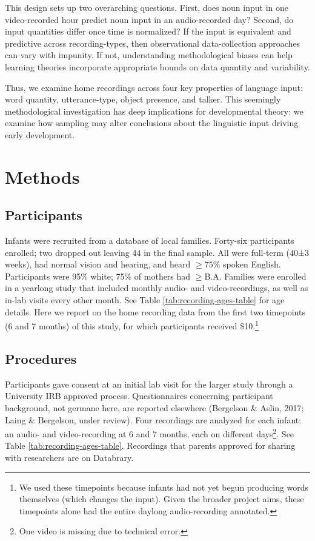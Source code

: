 \documentclass[man]{apa6}
\theoremstyle{definition}
\theoremstyle{definition}
\theoremstyle{definition}
\theoremstyle{remark}
\begin{document}
This design sets up two overarching questions. First, does noun input in
one video-recorded hour predict noun input in an audio-recorded day?
Second, do input quantities differ once time is normalized? If the input
is equivalent and predictive across recording-types, then observational
data-collection approaches can vary with impunity. If not, understanding
methodological biases can help learning theories incorporate appropriate
bounds on data quantity and variability.

Thus, we examine home recordings across four key properties of language
input: word quantity, utterance-type, object presence, and talker. This
seemingly methodological investigation has deep implications for
developmental theory: we examine how sampling may alter conclusions
about the linguistic input driving early development.

\section{Methods}\label{methods}

\subsection{Participants}\label{participants}

Infants were recruited from a database of local families. Forty-six
participants enrolled; two dropped out leaving 44 in the final sample.
All were full-term (40±3 weeks), had normal vision and hearing, and
heard \(\geq 75\%\) spoken English. Participants were 95\% white; 75\%
of mothers had \(\geq\)B.A. Families were enrolled in a yearlong study
that included monthly audio- and video-recordings, as well as in-lab
visits every other month. See Table \ref{tab:recording-ages-table} for
age details. Here we report on the home recording data from the first
two timepoints (6 and 7 months) of this study, for which participants
received
\$10.\footnote{We used these timepoints because infants had not yet begun producing words themselves (which changes the input). Given the broader project aims, these timepoints alone had the entire daylong audio-recording annotated.}

\subsection{Procedures}\label{procedures}

Participants gave consent at an initial lab visit for the larger study
through a University IRB approved process. Questionnaires concerning
participant background, not germane here, are reported elsewhere
(Bergelson \& Aslin, 2017; Laing \& Bergelson, under review). Four
recordings are analyzed for each infant: an audio- and video-recording
at 6 and 7 months, each on different
days\footnote{One video is missing due to technical error.}. See Table
\ref{tab:recording-ages-table}. Recordings that parents approved for
sharing with researchers are on Databrary.
\end{document}
